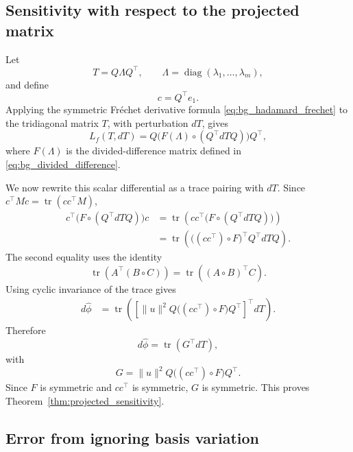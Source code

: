 \documentclass{article}
\begin{document}
\subsection{Sensitivity with respect to the projected matrix}
\label{app:sensitivity}

Let
\[
    T = Q\Lambda Q^\top,
    \qquad
    \Lambda=\operatorname{diag}(\lambda_1,\ldots,\lambda_m),
\]
and define
\[
    c = Q^\top e_1 .
\]
Applying the symmetric Fréchet derivative formula
\eqref{eq:bg_hadamard_frechet} to the tridiagonal matrix \(T\), with perturbation \(dT\),
gives
\begin{equation}
    L_f(T,dT)
    =
    Q\bigl(F(\Lambda)\circ(Q^\top dTQ)\bigr)Q^\top ,
    \label{eq:app_frechet_formula}
\end{equation}
where \(F(\Lambda)\) is the divided-difference matrix defined in
\eqref{eq:bg_divided_difference}.

We now rewrite this scalar differential as a trace pairing with \(dT\). Since
\(c^\top M c=\operatorname{tr}(cc^\top M)\),
\begin{align}
    c^\top
    \bigl(F\circ(Q^\top dTQ)\bigr)c
    &=
    \operatorname{tr}\!\left(
        cc^\top \bigl(F\circ(Q^\top dTQ)\bigr)
    \right) \\
    &=
    \operatorname{tr}\!\left(
        \bigl((cc^\top)\circ F\bigr)^\top Q^\top dTQ
    \right).
\end{align}
The second equality uses the identity
\[
    \operatorname{tr}\!\left(A^\top(B\circ C)\right)
    =
    \operatorname{tr}\!\left((A\circ B)^\top C\right).
\]
Using cyclic invariance of the trace gives
\begin{align}
    d\widehat{\phi}
    &=
    \operatorname{tr}\!\left(
        \left[
        \|u\|^2 Q\bigl((cc^\top)\circ F\bigr)Q^\top
        \right]^\top dT
    \right).
\end{align}
Therefore
\begin{equation}
    d\widehat{\phi}
    =
    \operatorname{tr}(G^\top dT),
    \label{eq:app_dphi_G}
\end{equation}
with
\begin{equation}
    G
    =
    \|u\|^2 Q\bigl((cc^\top)\circ F\bigr)Q^\top .
    \label{eq:app_G}
\end{equation}
Since \(F\) is symmetric and \(cc^\top\) is symmetric, \(G\) is symmetric. This proves
Theorem~\ref{thm:projected_sensitivity}.


\subsection{Error from ignoring basis variation}
\label{app:error}
\end{document}

